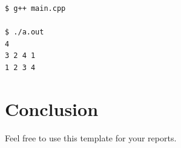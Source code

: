 \documentclass[12pt]{article}
\begin{document}
\begin{listing}[H]
\begin{verbatim}
$ g++ main.cpp

$ ./a.out
4
3 2 4 1
1 2 3 4

\end{verbatim}
\caption{Sample Output}
\label{lst:sample_plain}
\end{listing}

\clearpage

\section{Conclusion}
Feel free to use this template for your reports.

\clearpage




\clearpage

\listoffigures

\clearpage

\listoftables

\clearpage

\listoflistings
\end{document}
